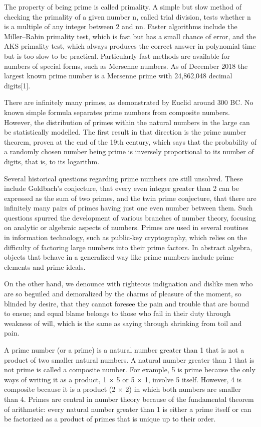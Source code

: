 The property of being prime is called primality. A simple but slow method of
checking the primality of a given number n, called trial
division, tests whether n is a multiple of any integer between
2 and { { {n}}}{ {n}}. Faster algorithms include the
Miller–Rabin primality test, which is fast but has a small chance of error, and
the AKS primality test, which always produces the correct answer in polynomial
time but is too slow to be practical. Particularly fast methods are available
for numbers of special forms, such as Mersenne numbers. As of December 2018 the
largest known prime number is a Mersenne prime with 24,862,048 decimal
digits[1].

There are infinitely many primes, as demonstrated by Euclid around 300 BC. No
known simple formula separates prime numbers from composite numbers. However,
the distribution of primes within the natural numbers in the large can be
statistically modelled. The first result in that direction is the prime number
theorem, proven at the end of the 19th century, which says that the probability
of a randomly chosen number being prime is inversely proportional to its number
of digits, that is, to its logarithm.

Several historical questions regarding prime numbers are still unsolved. These
include Goldbach's conjecture, that every even integer greater than 2 can be
expressed as the sum of two primes, and the twin prime conjecture, that there
are infinitely many pairs of primes having just one even number between
them. Such questions spurred the development of various branches of number
theory, focusing on analytic or algebraic aspects of numbers. Primes are used in
several routines in information technology, such as public-key cryptography,
which relies on the difficulty of factoring large numbers into their prime
factors. In abstract algebra, objects that behave in a generalized way like
prime numbers include prime elements and prime ideals.

On the other hand, we denounce with righteous indignation and dislike men who
are so beguiled and demoralized by the charms of pleasure of the moment, so
blinded by desire, that they cannot foresee the pain and trouble that are bound
to ensue; and equal blame belongs to those who fail in their duty through
weakness of will, which is the same as saying through shrinking from toil and
pain.

A prime number (or a prime) is a natural number greater than 1 that is not a
product of two smaller natural numbers. A natural number greater than 1 that is
not prime is called a composite number. For example, 5 is prime because the only
ways of writing it as a product, 1 × 5 or 5 × 1, involve 5 itself. However, 4 is
composite because it is a product (2 × 2) in which both numbers are smaller than
4. Primes are central in number theory because of the fundamental theorem of
arithmetic: every natural number greater than 1 is either a prime itself or can
be factorized as a product of primes that is unique up to their order.

